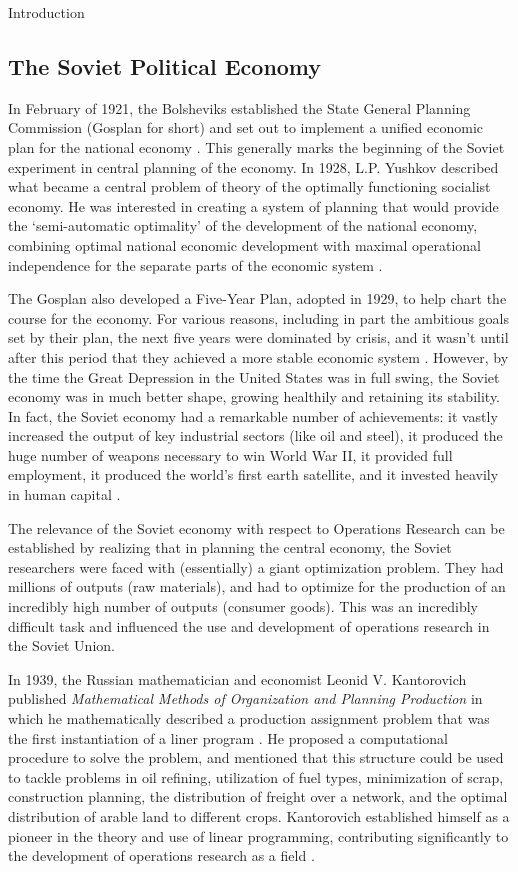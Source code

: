 \documentclass[12pt]{pom_thesis}
\theoremstyle{definition}
\begin{document}
\begin{chapter}{Introduction}
\subsection{The Soviet Political Economy}
	In February of 1921, the Bolsheviks established the State General Planning Commission (Gosplan for short) and set out to implement a unified economic plan for the national economy \cite{socialist-planning}. This generally marks the beginning of the Soviet experiment in central planning of the economy.  In 1928, L.P. Yushkov described what became a central problem of theory of the optimally functioning socialist economy. He was interested in creating a system of planning that would provide the `semi-automatic optimality' of the development of the national economy, combining optimal national economic development with maximal operational independence for the separate parts of the economic system \cite{planning-problems}. 
	
	The Gosplan also developed a Five-Year Plan, adopted in 1929, to help chart the course for the economy. For various reasons, including in part the ambitious goals set by their plan, the next five years were dominated by crisis, and it wasn't until after this period that they achieved a more stable economic system \cite{socialist-planning}. However, by the time the Great Depression in the United States was in full swing, the Soviet economy was in much better shape, growing healthily and retaining its stability. In fact, the Soviet economy had a remarkable number of achievements: it vastly increased the output of key industrial sectors (like oil and steel), it produced the huge number of weapons necessary to win World War II, it provided full employment, it produced the world's first earth satellite, and it invested heavily in human capital \cite{socialist-planning}.
	
	The relevance of the Soviet economy with respect to Operations Research can be established by realizing that in planning the central economy, the Soviet researchers were faced with (essentially) a giant optimization problem. They had millions of outputs (raw materials), and had to optimize for the production of an incredibly high number of outputs (consumer goods). This was an incredibly difficult task and influenced the use and development of operations research in the Soviet Union.
	
	In 1939, the Russian mathematician and economist Leonid V. Kantorovich published \textit{Mathematical Methods of Organization and Planning Production} in which he mathematically described a production assignment problem that was the first instantiation of a liner program \cite{or-timeline}. He proposed a computational procedure to solve the problem, and mentioned that this structure could be used to tackle problems in oil refining, utilization of fuel types, minimization of scrap, construction planning, the distribution of freight over a network, and the optimal distribution of arable land to different crops. Kantorovich established himself as a pioneer in the theory and use of linear programming, contributing significantly to the development of operations research as a field \cite{or-timeline}. \\
%
%

\end{chapter}
\end{document}
